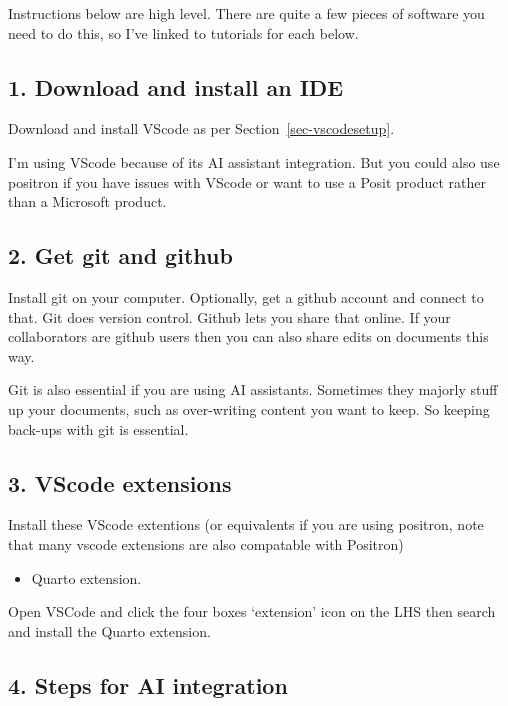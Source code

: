 \documentclass[
  letterpaper,
  DIV=11,
  numbers=noendperiod]{scrreprt}
\providecommand{\tightlist}{%
  \setlength{\itemsep}{0pt}\setlength{\parskip}{0pt}}\usepackage{longtable,booktabs,array}
\begin{document}
Instructions below are high level. There are quite a few pieces of
software you need to do this, so I've linked to tutorials for each
below.

\subsection{1. Download and install an
IDE}\label{download-and-install-an-ide}

Download and install VScode as per Section~\ref{sec-vscodesetup}.

I'm using VScode because of its AI assistant integration. But you could
also use positron if you have issues with VScode or want to use a Posit
product rather than a Microsoft product.

\subsection{2. Get git and github}\label{get-git-and-github}

Install git on your computer. Optionally, get a github account and
connect to that. Git does version control. Github lets you share that
online. If your collaborators are github users then you can also share
edits on documents this way.

Git is also essential if you are using AI assistants. Sometimes they
majorly stuff up your documents, such as over-writing content you want
to keep. So keeping back-ups with git is essential.

\subsection{3. VScode extensions}\label{vscode-extensions}

Install these VScode extentions (or equivalents if you are using
positron, note that many vscode extensions are also compatable with
Positron)

\begin{itemize}
\tightlist
\item
  Quarto extension.
\end{itemize}

Open VSCode and click the four boxes `extension' icon on the LHS then
search and install the Quarto extension.

\subsection{4. Steps for AI integration}\label{steps-for-ai-integration}
\end{document}
